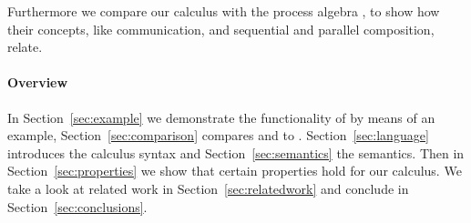 Furthermore we compare our calculus with the process algebra \CSP, to show how their concepts, like communication, and sequential and parallel composition, relate.



\paragraph{Overview}

In Section~\ref{sec:example} we demonstrate the functionality of \TOPHAT by means of an example,
Section~\ref{sec:comparison} compares \TOP and \TOPHAT to \CSP.
Section~\ref{sec:language} introduces the \TOPHAT calculus syntax
and Section~\ref{sec:semantics} the semantics.
Then in Section~\ref{sec:properties} we show that certain properties hold for our calculus.
We take a look at related work in Section~\ref{sec:relatedwork}
and conclude in Section~\ref{sec:conclusions}.
